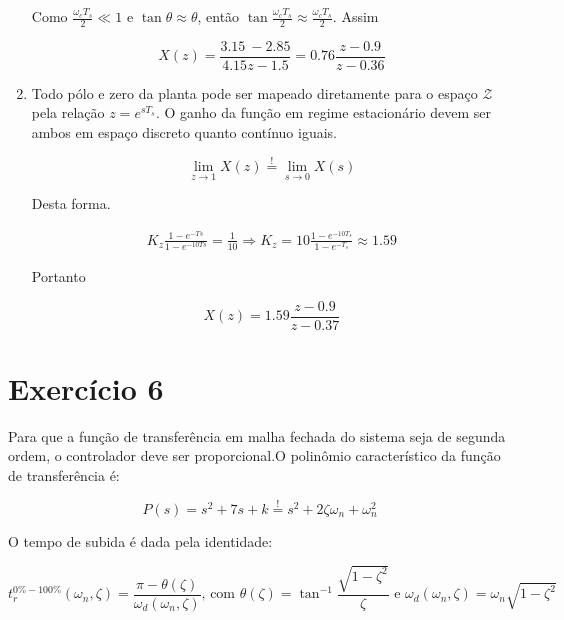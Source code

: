 \documentclass{article}
\begin{document}
\begin{enumerate}
Como $\frac{\omega_c T_s}{2} \ll 1$ e $\tan{\theta} \approx \theta$, então $\tan{\frac{\omega_c T_s}{2}} \approx \frac{\omega_c T_s}{2}$. Assim

\begin{equation}
X(z) = \frac{3.15\ - 2.85}{4.15z - 1.5} = 0.76 \frac{z - 0.9}{z - 0.36}
\end{equation}

\item %
Todo pólo e zero da planta pode ser mapeado diretamente para o espaço $\mathcal{Z}$ pela relação $z = e^{s T_s}$. O ganho da função em regime estacionário devem ser ambos em espaço discreto quanto contínuo iguais.

\begin{equation}
\lim\limits_{z \rightarrow 1} X(z) \stackrel{!}{=} \lim\limits_{s \rightarrow 0} X(s) 
\end{equation} 

Desta forma.

\begin{equation*}
\begin{split}
K_z \frac{1 - e^{-Ts}}{1 - e^{-10Ts}} = \frac{1}{10} \Rightarrow K_z = 10 \frac{1 - e^{-10T_s}}{1 - e^{-T_s}} \approx 1.59
\end{split}
\end{equation*}

Portanto

\begin{equation}
X(z) = 1.59 \frac{z - 0.9}{z - 0.37}
\end{equation}

\end{enumerate}

\section*{Exercício 6}
Para que a função de transferência em malha fechada do sistema seja de segunda ordem, o controlador deve ser proporcional.O polinômio característico da função de transferência é:

\begin{equation}
P(s) = s^2 + 7s + k \stackrel{!}{=} s^2 + 2 \zeta \omega_n + \omega_n^2
\end{equation}

O tempo de subida é dada pela identidade:

\begin{equation}
\label{eq:sobressinal}
t^{0\% - 100\%}_{r}(\omega_n, \zeta) = \frac{\pi - \theta(\zeta)}{\omega_d(\omega_n, \zeta)} \mbox{, com } \theta(\zeta) = \tan^{-1}\frac{\sqrt{1 - \zeta^2}}{\zeta} \mbox{ e } \omega_d(\omega_n, \zeta) = \omega_n \sqrt{1-\zeta^2}
\end{equation}
\end{document}
